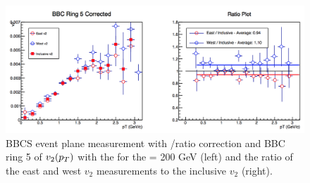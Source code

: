 \begin{figure}
\centering
\includegraphics[width=0.65\linewidth]{figs/bbc_5_pp.png}
\caption{BBCS event plane measurement with \pp/\pau ratio correction and BBC ring 5 of $v_{2}(\mbox{$p_T$})$ with the  for the \pau \sqsn = 200 GeV (left) and the ratio of the east and west $v_2$ measurements to the inclusive $v_2$ (right).}
\end{figure}
